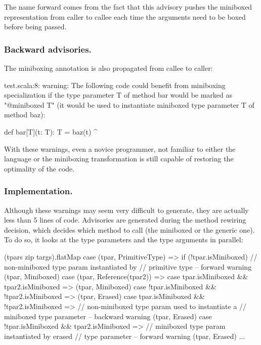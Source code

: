 The name forward comes from the fact that this advisory pushes the miniboxed representation from caller to callee each time the arguments need to be boxed before being passed.

\subsubsection{Backward advisories.} The miniboxing annotation is also propagated from callee to caller:

\begin{lstlisting-nobreak-nolang}
test.scala:8: warning: The following code could benefit from miniboxing specialization if the type parameter T of method bar would be marked as "@miniboxed T" (it would be used to instantiate miniboxed type parameter T of method baz):

        def bar[T](t: T): T = baz(t)
                              ^
\end{lstlisting-nobreak-nolang}

With these warnings, even a novice programmer, not familiar to either the language or the miniboxing transformation is still capable of restoring the optimality of the code.

\subsubsection{Implementation.} Although these warnings may seem very difficult to generate, they are actually less than 5 lines of code. Advisories are generated during the method rewiring decision, which decides which method to call (the miniboxed or the generic one). To do so, it looks at the type parameters and the type arguments in parallel:

\begin{lstlisting-nobreak}
 (tpars zip targs).flatMap {
   case (tpar, PrimitiveType) =>
     if (!tpar.isMiniboxed)
       // non-miniboxed type param instantiated by
       // primitive type -- forward warning
     (tpar, Miniboxed)
   case (tpar, Reference(tpar2)) =>
     case tpar.isMiniboxed && tpar2.isMiniboxed =>
       (tpar, Miniboxed)
     case !tpar.isMiniboxed && !tpar2.isMiniboxed =>
       (tpar, Erased)
     case tpar.isMiniboxed && !tpar2.isMiniboxed =>
       // non-miniboxed type param used to instantiate a
       // miniboxed type parameter -- backward warning
       (tpar, Erased)
     case !tpar.isMiniboxed && tpar2.isMiniboxed =>
       // miniboxed type param instantiated by erased
       // type parameter -- forward warning
       (tpar, Erased)
   ...
 }
\end{lstlisting-nobreak}

